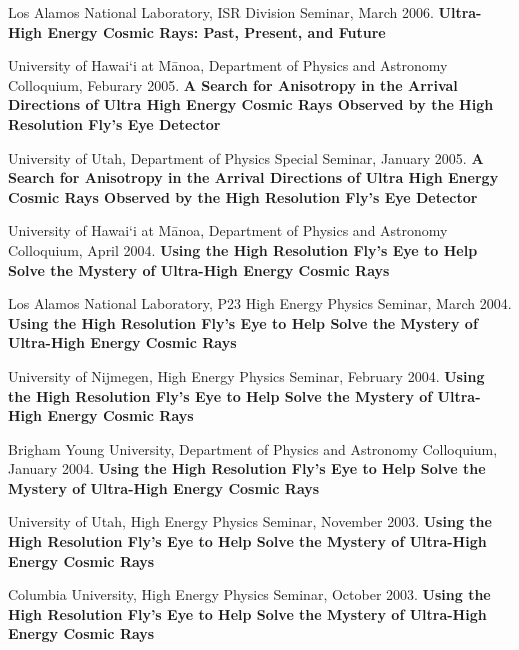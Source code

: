 \begin{resume}
Los Alamos National Laboratory, ISR Division Seminar, March 2006.
{\bf Ultra-High Energy Cosmic Rays: Past, Present, and Future}

University of Hawai`i at M\={a}noa,
Department of Physics and Astronomy Colloquium,
Feburary 2005.  {\bf A Search for Anisotropy in the Arrival Directions
of Ultra High Energy Cosmic Rays Observed by the High Resolution Fly's Eye
Detector}

University of Utah, Department of Physics Special Seminar, January 2005.
{\bf A Search for Anisotropy in the Arrival Directions
of Ultra High Energy Cosmic Rays Observed by the High Resolution Fly's Eye
Detector}

University of Hawai`i at M\={a}noa,
Department of Physics and Astronomy Colloquium,
April 2004.  {\bf Using the High Resolution Fly's Eye to Help Solve the
Mystery of Ultra-High Energy Cosmic Rays}

Los Alamos National Laboratory, P23 High Energy Physics Seminar, March 2004.
{\bf Using the High Resolution Fly's Eye to Help Solve the Mystery of
Ultra-High Energy Cosmic Rays}

University of Nijmegen, High Energy Physics Seminar, February 2004.
{\bf Using the High Resolution Fly's Eye to Help Solve the Mystery of
Ultra-High Energy Cosmic Rays}

Brigham Young University, Department of Physics and Astronomy Colloquium,
January 2004. {\bf Using the High Resolution Fly's Eye to Help Solve the
Mystery of Ultra-High Energy Cosmic Rays}

University of Utah, High Energy Physics Seminar, November 2003.
{\bf Using the High Resolution Fly's Eye to Help Solve the Mystery of
Ultra-High Energy Cosmic Rays}

Columbia University, High Energy Physics Seminar, October 2003.
{\bf Using the High Resolution Fly's Eye to Help Solve the Mystery of
Ultra-High Energy Cosmic Rays}

\end{resume}

